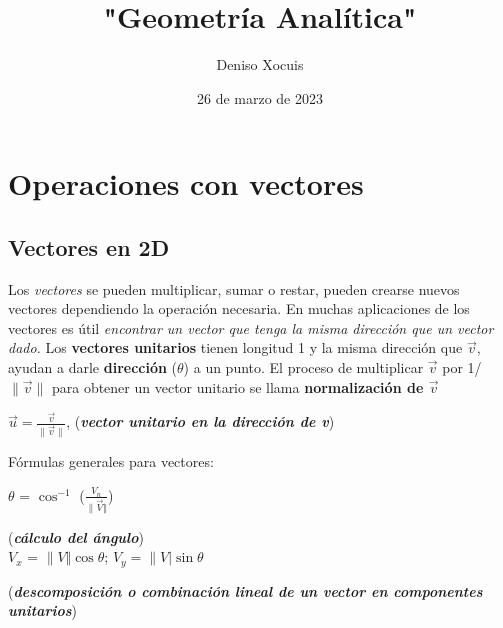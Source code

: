 \documentclass[letterpaper,12pt]{article}
\title {\textbf{"Geometría Analítica"}}
\author{Deniso Xocuis}
\date{26 de marzo de 2023}
\begin{document}
\maketitle
\thispagestyle{empty}
\newpage
\setcounter{page}{1}
\pagestyle{headings}

\begin{sloppypar} %
\section{Operaciones con vectores}
\subsection{Vectores en 2D}
\noindent Los \emph{vectores} se pueden multiplicar, sumar o restar, pueden crearse nuevos vectores dependiendo la operación necesaria. En muchas aplicaciones de los vectores es útil \emph{encontrar un vector que tenga la misma dirección que un vector dado.} Los \textbf{vectores unitarios} tienen longitud 1 y la misma dirección que $\vec{v}$, ayudan a darle \textbf{dirección} ($\theta$) a un punto. El proceso de multiplicar $\vec{v}$ por 1/$\| \vec{v} \|$ para obtener un vector unitario se llama \textbf{normalización de $\vec{v}$}

\begin{center}
    
    $\displaystyle \vec{u} = \frac{\vec{v}}{\| \vec{v} \|}$, \textcolor[rgb]{1,0,0}{(\textbf{\textit{vector unitario en la dirección de v}})}
\end{center}
\noindent Fórmulas generales para vectores:
\begin{center}
    
    $\theta$ = $\displaystyle \cos^{-1}$ ($\displaystyle \frac{V_n}{\| \vec{V} \Vert }$)
    
    \textcolor[rgb]{1,0,0} {(\textbf{\textit{cálculo del ángulo}})}
   \vspace{0.3cm}\\
    $V_x$ =  $\| {V} \Vert  \cos \theta$; $V_y = \|{V}\vert \sin \theta$  
    
    \textcolor[rgb]{1,0,0}{(\textbf{\textit{descomposición o combinación lineal de un vector en componentes unitarios}})}

\end{center}


\end{sloppypar}
\end{document}
